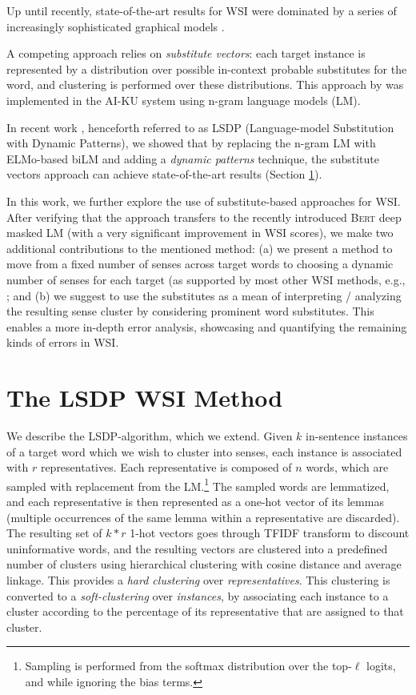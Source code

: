 \documentclass[11pt,a4paper]{article}
\begin{document}
Up until recently, state-of-the-art results for WSI were dominated by a series
of increasingly sophisticated graphical models
\cite{lau2013unimelb,wang2015sense,komninos2016structured,hwang2019autosense}. 

A competing approach relies on \emph{substitute vectors}: each target instance
is represented by a distribution over possible in-context probable substitutes for the
word, and clustering is performed over these distributions. This approach by
\citet{baskaya2013ai} was implemented in the AI-KU system using n-gram language
models (LM).

In recent work 
\cite{amrami2018word}, henceforth referred to as LSDP (Language-model Substitution with Dynamic Patterns), we showed that
by replacing the n-gram LM with ELMo-based biLM \cite{peters2018deep} and adding a \emph{dynamic
patterns} technique, the substitute vectors approach can achieve
state-of-the-art results (Section \ref{sec:elmosp}).

In this work, we further explore the use of substitute-based approaches for WSI. After verifying that the approach transfers to the recently introduced \textsc{Bert} deep masked LM \cite{devlin2018bert} (with a very significant improvement in WSI scores), we make two additional contributions to the mentioned method: (a) we present a method to move from a fixed number of senses across target words to choosing a dynamic number of senses for each target (as supported by most other WSI methods, e.g., \cite{teh2005sharing,komninos2016structured,hwang2019autosense}; and (b) we suggest to use the substitutes as a mean of interpreting / analyzing the resulting sense cluster by considering prominent word substitutes. This enables a more in-depth error analysis, showcasing and quantifying the remaining kinds of errors in WSI.


\section{The LSDP WSI Method}

\label{sec:elmosp}
We describe the LSDP-algorithm, which we extend.
Given $k$ in-sentence instances of a target word which we wish to cluster into senses, each instance is associated with $r$
representatives. Each representative is composed of $n$ words, which are
sampled with replacement from the LM.\footnote{Sampling is performed from the
softmax distribution over the top-$\ell$ logits, and while ignoring the bias
terms.} The sampled words are lemmatized, and each representative is then represented as
a one-hot vector of its lemmas (multiple
occurrences of the same lemma within a representative are discarded). The
resulting set of $k*r$ 1-hot vectors goes through TFIDF transform to
discount uninformative words, and the resulting vectors are clustered into a
predefined number of clusters using
hierarchical clustering with cosine distance and average linkage. This provides a \emph{hard clustering} over \emph{representatives}. This clustering is converted to a 
\emph{soft-clustering} over \emph{instances}, by associating each instance to a cluster according to the
percentage of its representative that are assigned to that cluster.
\end{document}
